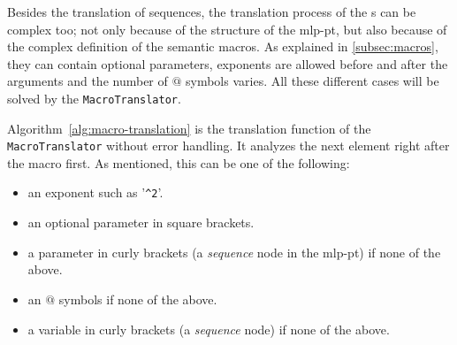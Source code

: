 Besides the translation of sequences, the translation process of the \Macro s can be complex too; not only because of the structure of the \gls{mlp-pt}, but also because of the complex definition of the semantic macros. As explained in \ref{subsec:macros}, they can contain optional parameters, exponents are allowed before and after the arguments and the number of $@$ symbols varies. All these different cases will be solved by the \verb|MacroTranslator|. 

Algorithm~\ref{alg:macro-translation} is the translation function of the \verb|MacroTranslator| without error handling. It analyzes the next element right after the macro first. As mentioned, this can be one of the following:
\begin{itemize}
\item an exponent such as '\verb|^2|'.
\item an optional parameter in square brackets.
\item a parameter in curly brackets (a \textit{sequence} node in the \gls{mlp-pt}) if none of the above.
\item an $@$ symbols if none of the above.
\item a variable in curly brackets (a \textit{sequence} node) if none of the above.
\end{itemize}

